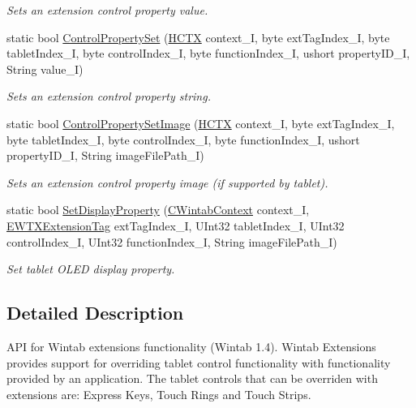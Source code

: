 \begin{DoxyCompactItemize}
\begin{DoxyCompactList}\small\item\em Sets an extension control property value. \item\end{DoxyCompactList}\item 
static bool \hyperlink{class_wintab_d_n_1_1_c_wintab_extensions_a605282fa9a1d72ff1c53775606a1ba83}{ControlPropertySet} (\hyperlink{class_wintab_d_n_1_1_h_c_t_x}{HCTX} context\_\-I, byte extTagIndex\_\-I, byte tabletIndex\_\-I, byte controlIndex\_\-I, byte functionIndex\_\-I, ushort propertyID\_\-I, String value\_\-I)
\begin{DoxyCompactList}\small\item\em Sets an extension control property string. \item\end{DoxyCompactList}\item 
static bool \hyperlink{class_wintab_d_n_1_1_c_wintab_extensions_a70da8e34e56b80909906820679911b75}{ControlPropertySetImage} (\hyperlink{class_wintab_d_n_1_1_h_c_t_x}{HCTX} context\_\-I, byte extTagIndex\_\-I, byte tabletIndex\_\-I, byte controlIndex\_\-I, byte functionIndex\_\-I, ushort propertyID\_\-I, String imageFilePath\_\-I)
\begin{DoxyCompactList}\small\item\em Sets an extension control property image (if supported by tablet). \item\end{DoxyCompactList}\item 
static bool \hyperlink{class_wintab_d_n_1_1_c_wintab_extensions_a2cf52c3a3471e4a5163dfc23d3749523}{SetDisplayProperty} (\hyperlink{class_wintab_d_n_1_1_c_wintab_context}{CWintabContext} context\_\-I, \hyperlink{namespace_wintab_d_n_a303ef868b8887dc43872ddac8a7d059b}{EWTXExtensionTag} extTagIndex\_\-I, UInt32 tabletIndex\_\-I, UInt32 controlIndex\_\-I, UInt32 functionIndex\_\-I, String imageFilePath\_\-I)
\begin{DoxyCompactList}\small\item\em Set tablet OLED display property. \item\end{DoxyCompactList}\end{DoxyCompactItemize}


\subsection{Detailed Description}
API for Wintab extensions functionality (Wintab 1.4). Wintab Extensions provides support for overriding tablet control functionality with functionality provided by an application. The tablet controls that can be overriden with extensions are: Express Keys, Touch Rings and Touch Strips.

